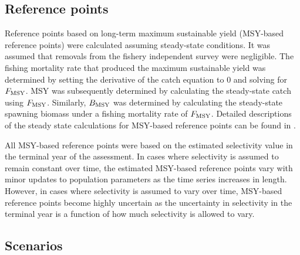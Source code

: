 





\subsection*{Reference points} %
\label{sub:reference_points}
Reference points based on long-term maximum sustainable yield (MSY-based reference points) were calculated assuming steady-state conditions.  It was assumed that removals from the fishery independent survey were negligible.  The fishing mortality rate that produced the maximum sustainable yield was determined by setting the derivative of the catch equation to 0 and solving for $F_{\rm{MSY}}$.  MSY was subsequently determined by calculating the steady-state catch using $F_{\rm{MSY}}$.  Similarly, $B_{\rm{MSY}}$ was determined by calculating the steady-state spawning biomass under a fishing mortality rate of $F_{\rm{MSY}}$. Detailed descriptions of the steady state calculations for MSY-based reference points can be found in \cite{Martell2008pam}.

 All MSY-based reference points were based on the estimated selectivity value in the terminal year of the assessment.  In cases where selectivity is assumed to remain constant over time, the estimated MSY-based reference points vary with minor updates to population parameters as the time series increases in length.  However, in cases where selectivity is assumed to vary over time, MSY-based reference points become highly uncertain as the uncertainty in selectivity in the terminal year is a function of how much selectivity is allowed to vary.



\subsection*{Scenarios} %
\label{sub:scenarios}



